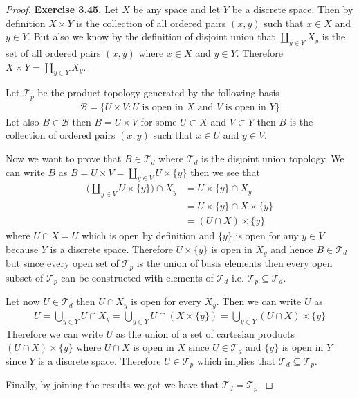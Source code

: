 \documentclass[11pt]{article}
\newcommand{\Topo}{\mathcal{T}}
\theoremstyle{definition}
\begin{document}
\cleardoublepage
\begin{proof}{\textbf{Exercise 3.45.}}
    Let $X$ be any space and let $Y$ be a discrete space.
    Then by definition $X \times Y$ is the collection of all ordered
    pairs $(x,y)$ such that $x \in X$ and $y \in Y$.
    But also we know by the definition of disjoint union that
    $\coprod_{y \in Y} X_y$ is the set of all ordered pairs $(x, y)$ where
    $x \in X$ and $y \in Y$. Therefore $X \times Y = \coprod_{y \in Y} X_y$.

    Let $\Topo_p$ be the product topology generated by the following basis
    \begin{align*}
        \mathcal{B} = \{U \times V:
        U \text{ is open in }X\text{ and }V \text{ is open in }Y\}
    \end{align*}
    Let also $B \in \mathcal{B}$ then $B = U \times V$ for some
    $U \subset X$ and $V \subset Y$ then $B$ is
    the collection of ordered pairs $(x,y)$ such that $x \in U$
    and $y \in V$.

    Now we want to prove that $B \in \Topo_d$ where $\Topo_d$ is the disjoint
    union topology. We can write $B$ as
    $B = U \times V = \coprod_{y \in V} U \times \{y\}$
    then we see that
    \begin{align*}
        \bigg(\coprod_{y \in V} U \times \{y\}\bigg) \cap X_y
            &= U \times \{y\} \cap X_y\\
            &= U \times \{y\} \cap X \times \{y\}\\
            &= (U \cap X) \times \{y\}
    \end{align*}
    where $U \cap X = U$ which is open by definition and $\{y\}$ is open
    for any $y \in V$ because $Y$ is a discrete space.
    Therefore $U \times \{y\}$ is open in $X_y$ and hence $B \in \Topo_d$
    but since every open set of $\Topo_p$ is the union of basis elements
    then every open subset of $\Topo_p$ can be constructed with elements of
    $\Topo_d$ i.e. $\Topo_p \subseteq \Topo_d$.
    
    Let now $U \in \Topo_d$ then $U \cap X_y$ is open for every $X_y$.
    Then we can write $U$ as
    \begin{align*}
        U = \bigcup_{y \in Y} U \cap X_y
        = \bigcup_{y \in Y} U \cap (X \times \{y\})
        = \bigcup_{y \in Y} (U \cap X) \times \{y\}
    \end{align*}
    Therefore we can write $U$ as the union of a set of cartesian products
    $(U \cap X) \times \{y\}$ where $U \cap X$ is open in $X$ since
    $U \in \Topo_d$ and $\{y\}$ is open in $Y$ since $Y$ is a discrete space.
    Therefore $U \in \Topo_p$ which implies that $\Topo_d \subseteq \Topo_p$.

    Finally, by joining the results we got we have that $\Topo_d = \Topo_p$.
\end{proof}
\end{document}
